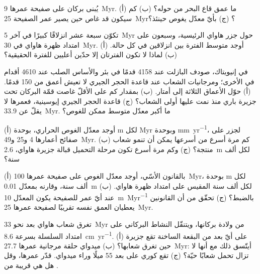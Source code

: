 \begin{exercise}[$\star$]\label{exo:b2:oceanic-islands:2}
يُبنى بركان على صفيحة عمرها \qty{9}{Myr}. (أ) ما عمق قاع البحر من حوله؟ (ب) كم
سيكون قد غاص حين يصير عمر الصفيحة \qty{25}{Myr}؟ (ج) بأيّ معدّل يغوص حينئذ؟
\end{exercise}

\begin{exercise}[$\star$]\label{exo:b2:oceanic-islands:3}
تكوّن سبعة عشر انزلاقًا كبيرًا في آخر \qty{5}{Myr} حول جزر هاواي الرئيسية،
وسبعون على امتداد ظهرة هاواي في \qty{30}{Myr}. (أ) أوجد متوسط الفترة بين انزلاقين في
كل حالة. (ب) لماذا لا تكون الفترتان إلا حدّين أعليين للفترة الحقيقية؟
\end{exercise}

\begin{exercise}[$\star$]\label{exo:b2:oceanic-islands:4}
في إنيويتاك، صودف البازلت عند 4158 قدمًا في بئر والأساس الصلب عند 4610 أقدام في
الأخرى؛ ومرجانيات الشعاب عند قاعدة الحجر الجيري لا تعيش أعمق من 150 قدمًا. (أ) حوّل
الأعماق الثلاثة إلى أمتار. (ب) بمقدار كم على الأقلّ غاصت قمّة البركان تحت جزيرة باري
منذ نمت عليها أولى الشعاب؟ (ج) قاعدة الحجر الجيري إيوسينية، فعمرها لا يقلّ عن
\qty{33.9}{Myr}. ما أكبر معدّل متوسط ممكن للغوص؟
\end{exercise}

\begin{exercise}[$\star\star$]\label{exo:b2:oceanic-islands:5}
(أ) أوجد معدّل الغوص الحراري، بوحدة \unit{m} لكل \unit{Myr} وبوحدة \unit{mm.yr^{-1}}، لجزر
على صفائح أعمارها 4 و25 و\qty{49}{Myr}. (ب) كم مرة أسرع من أسرعها
يمكن أن تنمو شعاب منتجة؟ (ج) وكم مرة أسرع تكون مرحلة التحميل قبالة جزيرة
هاواي، \qty{2.6}{m} لكل ألف سنة؟
\end{exercise}

\begin{exercise}[$\star\star$]\label{exo:b2:oceanic-islands:6}
(أ) بالقانون الأسّي، أوجد معدّل الغوص على صفيحة عمرها \qty{100}{Myr}، بوحدة \unit{m}
لكل ألف سنة، وقارنه بمعدّل \qty{0.01}{m} لكل ألف سنة المقيس على امتداد
ظهرة هاواي. (ب) عند أيّ عمر للصفيحة يكون المعدّل \qty{10}{m.Myr^{-1}} بالضبط؟ (ج) تحقّق من أن
القانونين يعطيان العمق نفسه تقريبًا لصفيحة عمرها \qty{25}{Myr}.
\end{exercise}

\begin{exercise}[$\star\star$]\label{exo:b2:oceanic-islands:7}
تغرق شعاب هاواي بعد نحو \qty{33}{Myr} من ولادة بركانها، ويتنقّل النشاط البركاني
على امتداد السلسلة بسرعة \qty{8.6}{cm.yr^{-1}}. (أ) على أيّ بعد من البقعة الساخنة تقع جزيرة حين
تغرق شعابها؟ (ب) ميدواي حلقة مرجانية عمرها \qty{27.7}{Myr}: أيتّسق ذلك مع أنها لا تزال تحمل
شعابًا حيّة؟ (ج) تقع كوري على بعد 55 ميلًا وراء ميدواي. قدّر عمرها، وقل هل هي قريبة
من .
\end{exercise}

